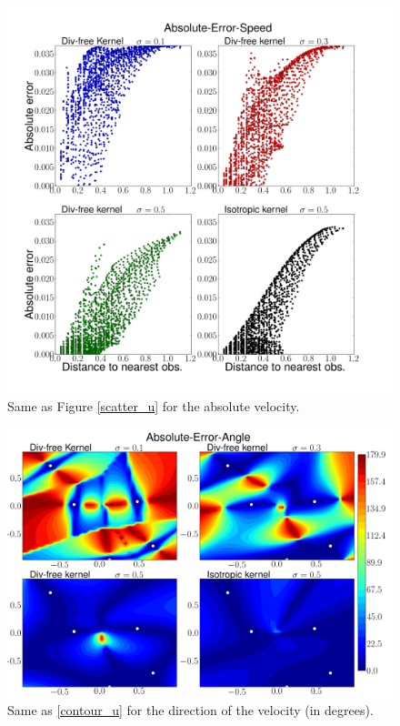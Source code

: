 \documentclass[12pt,a4paper]{article}%
\begin{document}
\begin{figure}
\noindent\includegraphics[width=36pc]{plots/Absolute-Error-Speed-scatter.png}
\caption{Same as Figure \ref{scatter_u} for the absolute velocity. }
\label{scatter_speed}
\end{figure}

\begin{figure}
\noindent\includegraphics[width=36pc]{plots/Absolute-Error-Angle-contour.png}
\caption{Same as \ref{contour_u} for the direction of the velocity (in degrees). }
\label{contour_angle}
\end{figure}
\end{document}
